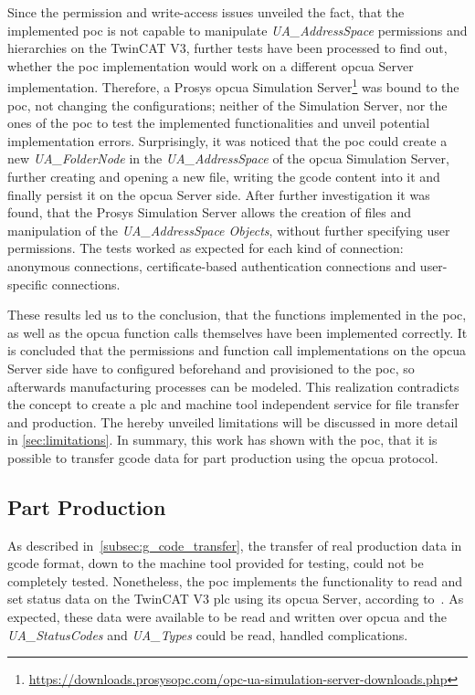 \documentclass[
a4paper,
twoside,
headsepline,
cleardoublepage=empty,
parskip=half,
draft=false
]{scrbook}
\begin{document}
				Since the permission and write-access issues unveiled the fact, that the implemented \gls{poc} is not capable to manipulate \textit{UA\_AddressSpace} permissions and hierarchies on the TwinCAT V3, further tests have been processed to find out, whether the \gls{poc} implementation would work on a different \gls{opcua} Server implementation.
				Therefore, a Prosys \gls{opcua} Simulation Server\footnote{\url{https://downloads.prosysopc.com/opc-ua-simulation-server-downloads.php}} was bound to the \gls{poc}, not changing the configurations; neither of the Simulation Server, nor the ones of the \gls{poc} to test the implemented functionalities and unveil potential implementation errors. 
				Surprisingly, it was noticed that the \gls{poc} could create a new \textit{UA\_FolderNode} in the \textit{UA\_AddressSpace} of the \gls{opcua} Simulation Server, further creating and opening a new file, writing the \gls{gcode} content into it and finally persist it on the \gls{opcua} Server side. After further investigation it was found, that the Prosys Simulation Server allows the creation of files and manipulation of the \textit{UA\_AddressSpace Objects}, without further specifying user permissions. The tests worked as expected for each kind of connection: anonymous connections, certificate-based authentication connections and user-specific connections.
				
				These results led us to the conclusion, that the functions implemented in the \gls{poc}, as well as the \gls{opcua} function calls themselves have been implemented correctly. It is concluded that the permissions and function call implementations on the \gls{opcua} Server side have to configured beforehand and provisioned to the \gls{poc}, so afterwards manufacturing processes can be modeled. This realization contradicts the concept to create a \gls{plc} and machine tool independent service for file transfer and production. The hereby unveiled limitations will be discussed in more detail in \cref{sec:limitations}. 
				In summary, this work has shown with the \gls{poc}, that it is possible to transfer \gls{gcode} data for part production using the \gls{opcua} protocol.

			\subsection{Part Production}\label{subsec:part_production}

				As described in~\cref{subsec:g_code_transfer}, the transfer of real production data in \gls{gcode} format, down to the machine tool provided for testing, could not be completely tested. 
				Nonetheless, the \gls{poc} implements the functionality to read and set status data on the TwinCAT V3 \gls{plc} using its \gls{opcua} Server, according to~\cite{twincat2018}.
				As expected, these data were available to be read and written over \gls{opcua} and the \textit{UA\_StatusCodes} and \textit{UA\_Types} could be read, handled complications.
				
\end{document}
